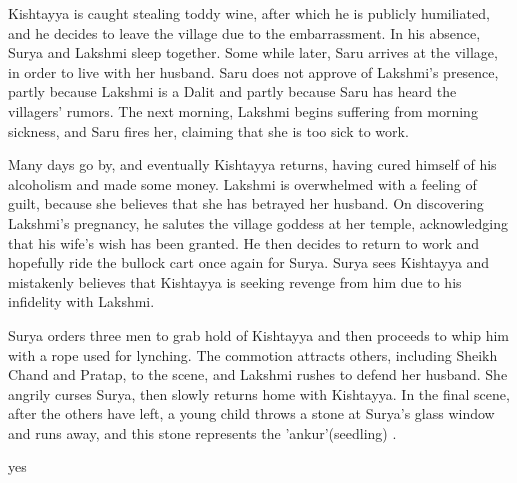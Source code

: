 \documentclass{article}
\begin{document}
Kishtayya is caught stealing toddy wine, after which he is publicly humiliated, and he decides to leave the village due to the embarrassment. In his absence, Surya and Lakshmi sleep together. Some while later, Saru arrives at the village, in order to live with her husband. Saru does not approve of Lakshmi's presence, partly because Lakshmi is a Dalit and partly because Saru has heard the villagers' rumors. The next morning, Lakshmi begins suffering from morning sickness, and Saru fires her, claiming that she is too sick to work.

Many days go by, and eventually Kishtayya returns, having cured himself of his alcoholism and made some money. Lakshmi is overwhelmed with a feeling of guilt, because she believes that she has betrayed her husband. On discovering Lakshmi's pregnancy, he salutes the village goddess at her temple, acknowledging that his wife's wish has been granted. He then decides to return to work and hopefully ride the bullock cart once again for Surya. Surya sees Kishtayya and mistakenly believes that Kishtayya is seeking revenge from him due to his infidelity with Lakshmi.

Surya orders three men to grab hold of Kishtayya and then proceeds to whip him with a rope used for lynching. The commotion attracts others, including Sheikh Chand and Pratap, to the scene, and Lakshmi rushes to defend her husband. She angrily curses Surya, then slowly returns home with Kishtayya. In the final scene, after the others have left, a young child throws a stone at Surya's glass window and runs away, and this stone represents the 'ankur'(seedling)
.

yes
\end{document}
